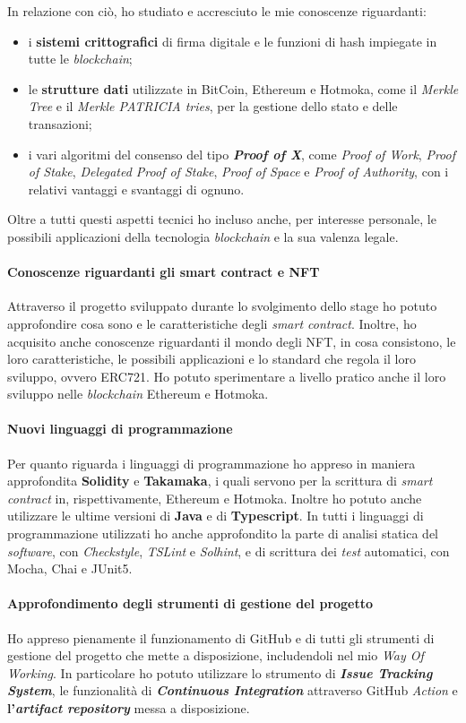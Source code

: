 \noindent In relazione con ciò, ho studiato e accresciuto le mie conoscenze riguardanti: 
\begin{itemize}
  \item i \textbf{sistemi crittografici} di firma digitale e le funzioni di hash impiegate in tutte le \textit{blockchain};
  \item le \textbf{strutture dati} utilizzate in BitCoin, Ethereum e Hotmoka, come il \textit{Merkle Tree} e il \textit{Merkle PATRICIA tries}, per la gestione dello stato e delle transazioni;
  \item i vari algoritmi del consenso del tipo \textbf{\textit{Proof of X}}, come \textit{Proof of Work}, \textit{Proof of Stake}, \textit{Delegated Proof of Stake}, \textit{Proof of Space} e \textit{Proof of Authority}, con i relativi vantaggi e svantaggi di ognuno.
\end{itemize}

Oltre a tutti questi aspetti tecnici ho incluso anche, per interesse personale, le possibili applicazioni della tecnologia \textit{blockchain} e la sua valenza legale.

\paragraph{Conoscenze riguardanti gli smart contract e NFT}
Attraverso il progetto sviluppato durante lo svolgimento dello stage ho potuto approfondire cosa sono e le caratteristiche degli \textit{smart contract}. Inoltre, ho acquisito anche conoscenze riguardanti il mondo degli NFT, in cosa consistono, le loro caratteristiche, le possibili applicazioni e lo standard che regola il loro sviluppo, ovvero ERC721. Ho potuto sperimentare a livello pratico anche il loro sviluppo nelle \textit{blockchain} Ethereum e Hotmoka.

\paragraph{Nuovi linguaggi di programmazione}
Per quanto riguarda i linguaggi di programmazione ho appreso in maniera approfondita \textbf{Solidity} e \textbf{Takamaka}, i quali servono per la scrittura di \textit{smart contract} in, rispettivamente, Ethereum e Hotmoka. Inoltre ho potuto anche utilizzare le ultime versioni di \textbf{Java} e di \textbf{Typescript}.
In tutti i linguaggi di programmazione utilizzati ho anche approfondito la parte di analisi statica del \textit{software}, con \textit{Checkstyle}, \textit{TSLint} e \textit{Solhint}, e di scrittura dei \textit{test} automatici, con Mocha, Chai e JUnit5.

\paragraph{Approfondimento degli strumenti di gestione del progetto}
Ho appreso pienamente il funzionamento di GitHub e di tutti gli strumenti di gestione del progetto che mette a disposizione, includendoli nel mio \textit{Way Of Working}. In particolare ho potuto utilizzare lo strumento di \textbf{\textit{Issue Tracking System}}, le funzionalità di \textbf{\textit{Continuous Integration}} attraverso GitHub \textit{Action} e \textbf{l'\textit{artifact repository}} messa a disposizione.

